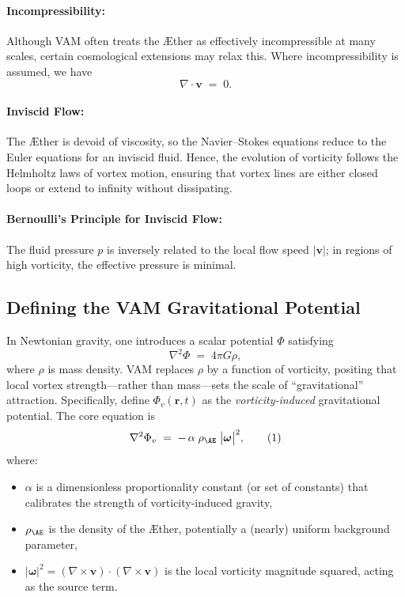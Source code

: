 \documentclass[aps,preprint,superscriptaddress]{revtex4-2}
\begin{document}
    \paragraph{Incompressibility:}
    Although VAM often treats the Æther as effectively incompressible at many scales, certain cosmological extensions may relax this. Where incompressibility is assumed, we have
    \[
        \nabla \cdot \mathbf{v} \;=\; 0.
    \]

    \paragraph{Inviscid Flow:}
    The Æther is devoid of viscosity, so the Navier–Stokes equations reduce to the Euler equations for an inviscid fluid. Hence, the evolution of vorticity follows the Helmholtz laws of vortex motion, ensuring that vortex lines are either closed loops or extend to infinity without dissipating.

    \paragraph{Bernoulli’s Principle for Inviscid Flow:}
    The fluid pressure \(p\) is inversely related to the local flow speed \(\lvert \mathbf{v} \rvert\); in regions of high vorticity, the effective pressure is minimal.

    \subsection{Defining the VAM Gravitational Potential}

    In Newtonian gravity, one introduces a scalar potential \(\Phi\) satisfying
    \[
        \nabla^2 \Phi \;=\; 4 \pi G \rho,
    \]
    where \(\rho\) is mass density. VAM replaces \(\rho\) by a function of vorticity, positing that local vortex strength—rather than mass—sets the scale of “gravitational” attraction. Specifically, define \(\Phi_v(\mathbf{r},t)\) as the \textit{vorticity-induced} gravitational potential. The core equation is
    \[
        \nabla^2 \Phi_v \;=\; -\,\alpha \;\rho_{\mathrm{\AE}}\;\bigl|\boldsymbol{\omega}\bigr|^2,
        \tag{1}
    \]
    where:
    \begin{itemize}
        \item \(\alpha\) is a dimensionless proportionality constant (or set of constants) that calibrates the strength of vorticity-induced gravity,
        \item \(\rho_{\mathrm{\AE}}\) is the density of the Æther, potentially a (nearly) uniform background parameter,
        \item \(\lvert \boldsymbol{\omega} \rvert^2 = (\nabla \times \mathbf{v})\cdot(\nabla \times \mathbf{v})\) is the local vorticity magnitude squared, acting as the source term.
    \end{itemize}
\end{document}

